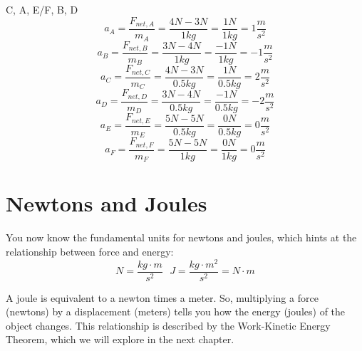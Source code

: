 \begin{Answer}[ref = netF]
C, A, E/F, B, D
$$a_A = \frac{F_{net, A}}{m_A} = \frac{4N - 3N}{1kg} = \frac{1N}{1kg} = 1 \frac{m}{s^2}$$
$$a_B = \frac{F_{net, B}}{m_B} = \frac{3N - 4N}{1kg} = \frac{-1N}{1kg} = -1 \frac{m}{s^2}$$
$$a_C = \frac{F_{net, C}}{m_C} = \frac{4N - 3N}{0.5kg} = \frac{1N}{0.5kg} = 2 \frac{m}{s^2}$$
$$a_D = \frac{F_{net, D}}{m_D} = \frac{3N - 4N}{0.5kg} = \frac{-1N}{0.5kg} = -2 \frac{m}{s^2}$$
$$a_E = \frac{F_{net, E}}{m_E} = \frac{5N - 5N}{0.5kg} = \frac{0N}{0.5kg} = 0 \frac{m}{s^2}$$
$$a_F = \frac{F_{net, F}}{m_F} = \frac{5N - 5N}{1kg} = \frac{0N}{1kg} = 0 \frac{m}{s^2}$$
\end{Answer}

\section{Newtons and Joules}
You now know the fundamental units for newtons and joules, which hints at the relationship between force and energy:
$$N = \frac{kg \cdot m}{s^2} \text{     } J = \frac{kg \cdot m^2}{s^2} = N \cdot m$$

A joule is equivalent to a newton times a meter. So, multiplying a force (newtons) by a displacement (meters) tells you how the energy (joules) of the object changes. This relationship is described by the Work-Kinetic Energy Theorem, which we will explore in the next chapter. 

